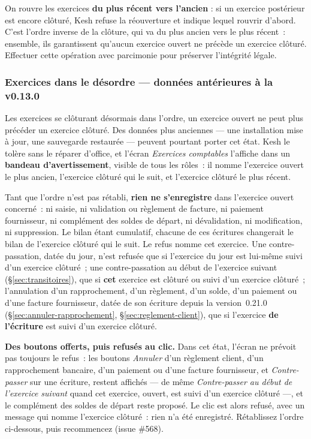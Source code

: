 \documentclass[a4paper,11pt,oneside]{article}
\begin{document}
\begin{keshtip}
On rouvre les exercices \textbf{du plus récent vers l'ancien} : si un exercice postérieur est encore clôturé, Kesh refuse la réouverture et indique lequel rouvrir d'abord. C'est l'ordre inverse de la clôture, qui va du plus ancien vers le plus récent~: ensemble, ils garantissent qu'aucun exercice ouvert ne précède un exercice clôturé. Effectuer cette opération avec parcimonie pour préserver l'intégrité légale.
\end{keshtip}

\subsubsection{Exercices dans le désordre --- données antérieures à la v0.13.0}\label{sec:exercices-desordre}

Les exercices se clôturant désormais dans l'ordre, un exercice ouvert ne peut plus précéder un exercice clôturé. Des données plus anciennes --- une installation mise à jour, une sauvegarde restaurée --- peuvent pourtant porter cet état. Kesh le tolère sans le réparer d'office, et l'écran \emph{Exercices comptables} l'affiche dans un \textbf{bandeau d'avertissement}, visible de tous les rôles~: il nomme l'exercice ouvert le plus ancien, l'exercice clôturé qui le suit, et l'exercice clôturé le plus récent.

Tant que l'ordre n'est pas rétabli, \textbf{rien ne s'enregistre} dans l'exercice ouvert concerné~: ni saisie, ni validation ou règlement de facture, ni paiement fournisseur, ni complément des soldes de départ, ni dévalidation, ni modification, ni suppression. Le bilan étant cumulatif, chacune de ces écritures changerait le bilan de l'exercice clôturé qui le suit. Le refus nomme cet exercice. Une contre-passation, datée du jour, n'est refusée que si l'exercice du jour est lui-même suivi d'un exercice clôturé~; une contre-passation au début de l'exercice suivant (\S\ref{sec:transitoires}), que si \textbf{cet} exercice est clôturé ou suivi d'un exercice clôturé~; l'annulation d'un rapprochement, d'un règlement, d'un solde, d'un paiement ou d'une facture fournisseur, datée de son écriture depuis la version~0.21.0 (\S\ref{sec:annuler-rapprochement}, \S\ref{sec:reglement-client}), que si l'exercice \textbf{de l'écriture} est suivi d'un exercice clôturé.

\textbf{Des boutons offerts, puis refusés au clic.} Dans cet état, l'écran ne prévoit pas toujours le refus~: les boutons \emph{Annuler} d'un règlement client, d'un rapprochement bancaire, d'un paiement ou d'une facture fournisseur, et \emph{Contre-passer} sur une écriture, restent affichés --- de même \emph{Contre-passer au début de l'exercice suivant} quand cet exercice, ouvert, est suivi d'un exercice clôturé ---, et le complément des soldes de départ reste proposé. Le clic est alors refusé, avec un message qui nomme l'exercice clôturé~: rien n'a été enregistré. Rétablissez l'ordre ci-dessous, puis recommencez (issue \#568).
\end{document}
